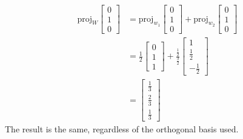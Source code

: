 \documentclass{article}
\begin{document}
\begin{equation}
    \begin{split}
        \mathrm{proj}_W \begin{bmatrix}
            0 \\ 1 \\ 0
        \end{bmatrix} & = \mathrm{proj}_{w_1} \begin{bmatrix}
            0 \\ 1 \\ 0
        \end{bmatrix} + \mathrm{proj}_{w_2} \begin{bmatrix}
            0 \\ 1 \\ 0
        \end{bmatrix} \\
        & = \frac{1}{2}\begin{bmatrix}0 \\ 1 \\ 1\end{bmatrix} + \frac{\frac{1}{2}}{\frac{3}{2}}\begin{bmatrix}1 \\ \frac{1}{2} \\ -\frac{1}{2}\end{bmatrix} \\
        & = \begin{bmatrix}\frac{1}{3} \\ \frac{2}{3} \\ \frac{1}{3}\end{bmatrix}
    \end{split}
\end{equation}
The result is the same, regardless of the orthogonal basis used.

\clearpage
\end{document}
